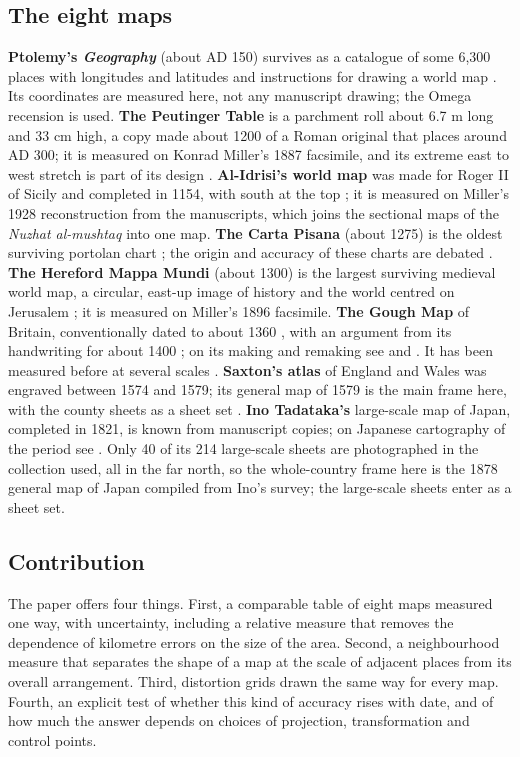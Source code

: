 \documentclass[11pt,a4paper]{article}
\begin{document}
\subsection{The eight maps}
\textbf{Ptolemy's \textit{Geography}} (about AD 150) survives as a catalogue of some 6,300 places with longitudes and latitudes and instructions for drawing a world map \citep{berggren2000,stuckelberger2006,dilke1987a}. Its coordinates are measured here, not any manuscript drawing; the Omega recension is used. \textbf{The Peutinger Table} is a parchment roll about 6.7 m long and 33 cm high, a copy made about 1200 of a Roman original that \citet{talbert2010} places around AD 300; it is measured on Konrad Miller's 1887 facsimile, and its extreme east to west stretch is part of its design \citep{dilke1987b,talbert2010}. \textbf{Al-Idrisi's world map} was made for Roger II of Sicily and completed in 1154, with south at the top \citep{ahmad1992}; it is measured on Miller's 1928 reconstruction from the manuscripts, which joins the sectional maps of the \textit{Nuzhat al-mushtaq} into one map. \textbf{The Carta Pisana} (about 1275) is the oldest surviving portolan chart \citep{campbell1987}; the origin and accuracy of these charts are debated \citep{campbell1987,nicolai2016}. \textbf{The Hereford Mappa Mundi} (about 1300) is the largest surviving medieval world map, a circular, east-up image of history and the world centred on Jerusalem \citep{harvey1996,westrem2001,woodward1987}; it is measured on Miller's 1896 facsimile. \textbf{The Gough Map} of Britain, conventionally dated to about 1360 \citep{parsons1958}, with an argument from its handwriting for about 1400 \citep{smallwood2010}; on its making and remaking see \citet{solopova2012} and \citet{delanosmith2017}. It has been measured before at several scales \citep{lilley2009,lloyd2009}. \textbf{Saxton's atlas} of England and Wales was engraved between 1574 and 1579; its general map of 1579 is the main frame here, with the county sheets as a sheet set \citep{evans1979}. \textbf{Ino Tadataka's} large-scale map of Japan, completed in 1821, is known from manuscript copies; on Japanese cartography of the period see \citet{unno1994}. Only 40 of its 214 large-scale sheets are photographed in the collection used, all in the far north, so the whole-country frame here is the 1878 general map of Japan compiled from Ino's survey; the large-scale sheets enter as a sheet set.

\subsection{Contribution}
The paper offers four things. First, a comparable table of eight maps measured one way, with uncertainty, including a relative measure that removes the dependence of kilometre errors on the size of the area. Second, a neighbourhood measure that separates the shape of a map at the scale of adjacent places from its overall arrangement. Third, distortion grids drawn the same way for every map. Fourth, an explicit test of whether this kind of accuracy rises with date, and of how much the answer depends on choices of projection, transformation and control points.
\end{document}
